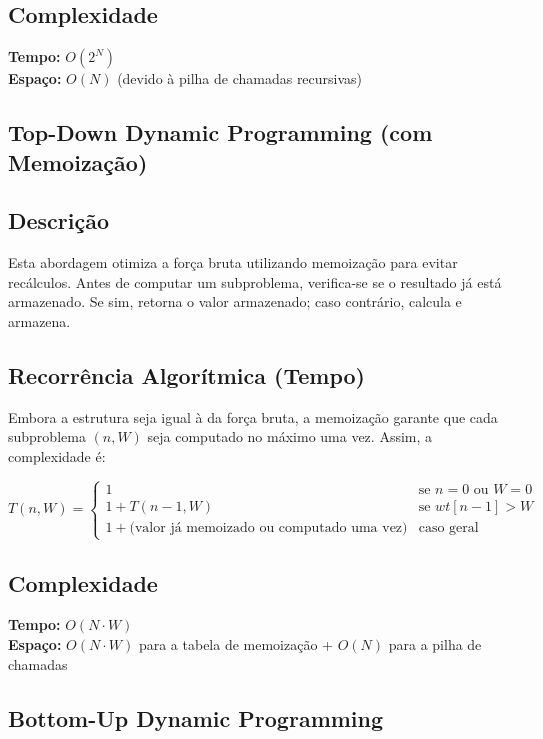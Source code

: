 \subsection*{Complexidade}
\textbf{Tempo:} \( O(2^N) \) \\
\textbf{Espaço:} \( O(N) \) (devido à pilha de chamadas recursivas)




\subsection{Top-Down Dynamic Programming (com Memoização)}
\subsection*{Descrição}
Esta abordagem otimiza a força bruta utilizando memoização para evitar recálculos. Antes de computar um subproblema, 
verifica-se se o resultado já está armazenado. Se sim, retorna o valor armazenado; caso contrário, calcula e armazena.

\subsection*{Recorrência Algorítmica (Tempo)}
Embora a estrutura seja igual à da força bruta, a memoização garante que cada subproblema \( (n, W) \) seja computado no máximo uma vez.
Assim, a complexidade é:

\[T(n, W) = \begin{cases}
1 & \text{se } n = 0 \text{ ou } W = 0 \\
1 + T(n - 1, W) & \text{se } wt[n - 1] > W \\
1 + \text{(valor já memoizado ou computado uma vez)} & \text{caso geral}
\end{cases}\]

\subsection*{Complexidade}
\textbf{Tempo:} \( O(N \cdot W) \) \\
\textbf{Espaço:} \( O(N \cdot W) \) para a tabela de memoização + \( O(N) \) para a pilha de chamadas




\subsection{Bottom-Up Dynamic Programming}
